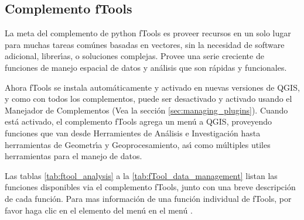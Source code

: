 
\subsection{Complemento fTools}\label{sec:ftools}


La meta del complemento de python fTools es proveer recursos en un solo lugar para
muchas tareas com\'unes basadas en vectores, sin la necesidad de software adicional, 
librer\'{\i}as, o soluciones complejas. Provee una serie creciente de funciones 
de manejo espacial de datos y an\'alisis que son r\'apidas y funcionales. 

Ahora fTools se instala autom\'aticamente y activado en nuevas versiones de QGIS, y como con todos los complementos, puede 
ser desactivado y activado usando el Manejador de Complementos (Vea la secci\'on \ref{sec:managing_plugins}).
Cuando est\'a activado, el complemento fTools agrega un men\'u  a QGIS, proveyendo funciones que van desde 
Herramientes de An\'alisis e Investigaci\'on hasta herramientas de Geometr\'{\i}a y Geoprocesamiento, as\'{\i} como m\'ultiples utiles herramientas para el manejo de datos.

\label{ftool_functions}

Las tablas \ref{tab:ftool_analysis} a la \ref{tab:fTool_data_management} listan las funciones disponibles via el complemento fTools, junto con una breve descripci\'on de cada funci\'on. Para mas informaci\'on de una funci\'on individual de fTools, por favor haga clic en el elemento del men\'u  en el men\'u .

